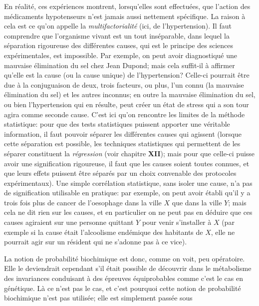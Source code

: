 {\eightpoint  En r\'ealit\'e, ces exp\'eriences montrent, lorsqu'elles 
sont effectu\'ees, que l'action des m\'edicaments hypotenseurs n'est 
jamais aussi nettement sp\'ecifique. La raison \`a cela est ce qu'on 
appelle la {\it multifactorialit\'e} (ici, de l'hypertension). Il faut 
comprendre que l'organisme vivant est un tout ins\'eparable, dans lequel 
la s\'eparation rigoureuse des diff\'erentes causes, qui est le principe 
des sciences exp\'erimentales, est impossible. Par exemple, on peut 
avoir diagnostiqu\'e une mauvaise \'elimination du sel chez Jean Dupond; 
mais cela suffit-il \`a affirmer qu'elle est la cause (ou la cause unique) 
de l'hypertension? Celle-ci pourrait \^etre due \`a la conjuguaison de 
deux, trois facteurs, ou plus, l'un connu (la mauvaise \'elimination du 
sel) et les autres inconnus; en outre la mauvaise \'elimination du sel, 
ou bien l'hypertension qui en r\'esulte, peut cr\'eer un \'etat de stress 
qui a son tour agira comme seconde cause. 
\medskip 
C'est ici qu'on rencontre les limites de la m\'ethode statistique: pour
que des tests statistiques puissent apporter une v\'eritable information, 
il faut pouvoir s\'eparer les diff\'erentes causes qui agissent (lorsque 
cette s\'eparation est possible, les techniques statistiques qui 
permettent de les s\'eparer constituent la {\it r\'egression} (voir 
chapitre {\bf XII}); mais pour que celle-ci puisse avoir une signification 
rigoureuse, il faut que les causes soient toutes connues, et que leurs 
effets puissent \^etre s\'epar\'es par un choix convenable des protocoles 
exp\'erimentaux). Une simple corr\'elation statistique, sans isoler une 
cause, n'a pas de signification utilisable en pratique: par exemple, on 
peut avoir \'etabli qu'il y a trois fois plus de cancer de l'oesophage
dans la ville $X$ que dans la ville $Y$; mais cela ne dit rien sur les
causes, et en particulier on ne peut pas en d\'eduire que ces causes 
agiraient sur une personne quittant $Y$ pour venir s'installer \`a 
$X$ (par exemple si la cause \'etait l'alcoolisme end\'emique des 
habitants de $X$, elle ne pourrait agir sur un r\'esident qui ne s'adonne 
pas \`a ce vice). \par } %
\medskip
La notion de probabilit\'e biochimique est donc, comme on voit, peu 
op\'eratoire.  Elle le deviendrait cependant s'il \'etait possible de
d\'ecouvrir dans le m\'etabolisme des invariances conduisant \`a des
\'epreuves \'equiprobables comme c'est le cas en g\'en\'etique. L\`a
ce n'est pas le cas, et c'est pourquoi cette notion de probabilit\'e
biochimique n'est pas utilis\'ee; elle est simplement pass\'ee sous
